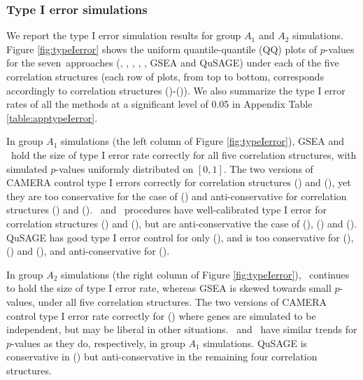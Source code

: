 	
	
	\subsubsection{Type I error simulations}\label{subsection:typeIerror}
	
	
	We report the type I error simulation results for group $A_1$ and $A_2$ simulations. Figure
	\ref{fig:typeIerror} shows the uniform quantile-quantile (QQ) plots of $p$-values for the
	seven~approaches (\OurMethod, \gent, \genr, \CMT, \CMR, GSEA and QuSAGE) under each of the five
	correlation structures (each row of plots, from top to
	bottom, corresponds accordingly to correlation structures (\aaCase)-(\fCase)). We also 
	summarize the type I error rates of all the methods at a significant level of 0.05 in Appendix 
	Table \ref{table:apptypeIerror}.
	
	In group $A_1$ simulations (the left column of Figure \ref{fig:typeIerror}),  GSEA and
	\OurMethod~hold the size of type I error rate correctly for all five correlation structures, 
	with
	simulated $p$-values uniformly distributed on $[0, 1]$. The two versions of CAMERA control type 
	I
	errors correctly for correlation structures (\aaCase) and (\aCase), yet they are too 
	conservative
	for the case of (\cCase) and anti-conservative for correlation structures (\eCase) and (\fCase).
	\gent~and \genr~procedures have well-calibrated type I error for correlation structures 
	(\aaCase)
	and (\cCase), but are anti-conservative the case of (\aCase), (\eCase) and (\fCase). QuSAGE has 
	good
	type I error control for only (\aCase), and is too conservative for (\aaCase), (\eCase) and
	(\fCase), and anti-conservative for (\cCase).
	
	In group $A_2$ simulations (the right column of Figure \ref{fig:typeIerror}),  
	\OurMethod~continues
	to hold the size of type I error rate, whereas GSEA is skewed towards small $p$-values, under 
	all
	five correlation structures. The two versions of CAMERA control type I error rate correctly for
	(\aaCase) where genes are simulated to be independent, but may be liberal in other situations.
	\gent~and \genr~have similar trends for $p$-values as they do, respectively, in group $A_1$
	simulations. QuSAGE is conservative in (\cCase) but anti-conservative in the remaining four
	correlation structures.
	
